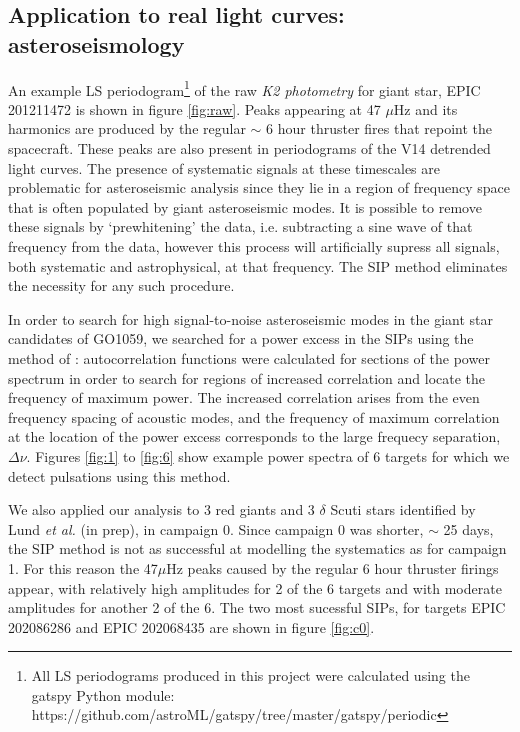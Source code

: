 \documentclass[useAMS, usenatbib, preprint, 12pt]{aastex}
\begin{document}
\subsection{Application to real light curves: asteroseismology}

An example LS periodogram\footnote{All LS periodograms
produced in this project were calculated using the gatspy Python module:
https://github.com/astroML/gatspy/tree/master/gatspy/periodic} of the raw {\it
K2 photometry} for giant star, EPIC 201211472 is shown in figure
\ref{fig:raw}.
Peaks appearing at 47 $\mu$Hz and its harmonics are produced by the regular
$\sim$ 6 hour thruster fires that repoint the spacecraft.
These peaks are also present in periodograms of the V14 detrended light curves.
The presence of systematic signals at these timescales are problematic for
asteroseismic analysis since they lie in a region of frequency space
that is often populated by giant asteroseismic modes.
It is possible to remove these signals by `prewhitening' the data, i.e.
subtracting a sine wave of that frequency from the data, however this process
will artificially supress all signals, both systematic and astrophysical, at
that frequency.
The SIP method eliminates the necessity for any such procedure.

In order to search for high signal-to-noise asteroseismic modes in the giant
star candidates of GO1059, we searched for a power excess in the SIPs using the
method of \citet{Huber2009}: autocorrelation functions were calculated for
sections of the power spectrum in order to search for regions of increased
correlation and locate the frequency of maximum power.
The increased correlation arises from the even frequency spacing of acoustic
modes, and the frequency of maximum correlation at the location of the power
excess corresponds to the large frequecy separation, $\Delta\nu$.
Figures \ref{fig:1} to \ref{fig:6} show example power spectra of 6 targets for
which we detect pulsations using this method.


We also applied our analysis to 3 red giants and 3 $\delta$ Scuti stars
identified by Lund {\it et al.} (in prep), in campaign 0.
Since campaign 0 was shorter, $\sim$ 25 days, the SIP method is not as
successful at modelling the systematics as for campaign 1.
For this reason the 47$\mu$Hz peaks caused by the regular 6 hour thruster
firings appear, with relatively high amplitudes for 2 of the 6 targets and with
moderate amplitudes for another 2 of the 6.
The two most sucessful SIPs, for targets EPIC 202086286 and EPIC
202068435 are shown in figure \ref{fig:c0}.
\end{document}

